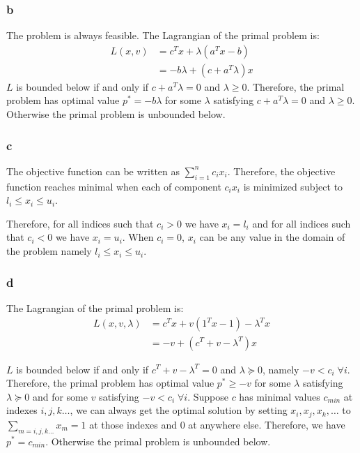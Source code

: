 \message{ !name(ass3_ChangLi.tex)}\documentclass[10pt,a4paper]{article}
\begin{document}
\subsubsection{b}
The problem is always feasible. The Lagrangian of the primal
problem is:
\begin{align*}
  L(x,v) &= c^Tx + \lambda(a^Tx-b)\\
         &= -b\lambda+(c+a^T\lambda)x
\end{align*}
$L$ is bounded below if and only if $c+a^T\lambda=0$ and
$\lambda\geq0$. Therefore, the primal problem has optimal value
$p^*=-b\lambda$ for some $\lambda$ satisfying $c+a^T\lambda=0$ and
$\lambda\geq0$. Otherwise the primal problem is unbounded below.

\subsubsection{c}

The objective function can be written as
$\sum_{i=1}^nc_ix_i$. Therefore, the objective function
reaches minimal when each of component $c_ix_i$ is
minimized subject to $l_i\leq x_i\leq u_i$.

Therefore, for all indices such that $c_i>0$ we have
$x_i=l_i$ and for all indices such that $c_i<0$ we have
$x_i=u_i$. When $c_i=0$, $x_i$ can be any value in the
domain of the problem namely $l_i\leq x_i\leq u_i$.

\subsubsection{d}

The Lagrangian of the primal problem is:
\begin{align*}
  L(x,v,\lambda) &= c^Tx + v(1^Tx-1)-\lambda^Tx\\
         &= -v+(c^T+v-\lambda^T)x
\end{align*}

$L$ is bounded below if and only if $c^T+v-\lambda^T=0$ and
$\lambda\succeq0$, namely $-v< c_i \;\forall i$. Therefore,
the primal problem has optimal value $p^*\geq -v$ for some
$\lambda$ satisfying $\lambda\succeq0$ and for some $v$
satisfying $-v <c_i\;\forall i$. Suppose $c$ has minimal
values $c_{min}$ at indexes $i,j,k\dots$, we can always get
the optimal solution by setting $x_i, x_j, x_k,\dots$ to
$\sum_{m=i,j,k\dots}x_m=1$ at those indexes and $0$ at
anywhere else. Therefore, we have $p^*=c_{min}$. Otherwise
the primal problem is unbounded below.
\end{document}
